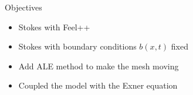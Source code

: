    
%
%
%
%
%
%
%
%
%

\begin{frame}{Objectives}
\begin{itemize}
\item Stokes with Feel++
\item Stokes with boundary conditions $ b(x,t)$ fixed
\item Add ALE method to make the mesh moving
\item Coupled the model with the Exner equation
\end{itemize}
\end{frame}